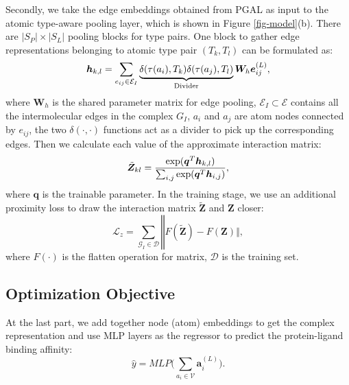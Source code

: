 \documentclass[sigconf]{acmart}
\newcommand{\gnn}{PGAL\xspace}
\newcommand{\graph}{\ensuremath{\mathcal{G}_I}}
\newcommand{\cat}{\ensuremath{\mathbin\Vert}}
\begin{document}
Secondly, we take the edge embeddings obtained from \gnn as input to the atomic type-aware pooling layer, which is shown in Figure \ref{fig-model}(b). There are $|S_P|\times|S_L|$ pooling blocks for type pairs. One block to gather edge representations belonging to atomic type pair $(T_k,T_l)$ can be formulated as:
\begin{equation}
\label{eq-pool}
   \bm{h}_{k,l} = \sum_{e_{ij} \in \mathcal{E}_I}\underbrace{ \delta(\tau(a_i), T_k) \delta(\tau(a_j),T_l)}_{{}{\rm Divider}} \bm{W}_h \bm{e}^{(L)}_{ij},
\end{equation}
where $\bm{W}_h$ is the shared parameter matrix for edge pooling, $\mathcal{E}_I \subset \mathcal{E}$ contains all the intermolecular edges in the complex $G_I$, $a_i$ and $a_j$ are atom nodes connected by $e_{ij}$, the two $\delta(\cdot,\cdot)$ functions act as a divider to pick up the corresponding edges. Then we calculate each value of the approximate interaction matrix:
\begin{equation}
\label{eq-im-normal}
   \tilde{\bm{Z}}_{kl} = \frac{{\rm exp}(\bm{q}^T \bm{h}_{k,l})}{\sum_{i,j}{\rm exp}(\bm{q}^T\bm{h}_{i,j})},
\end{equation}
where $\bm{q}$ is the trainable parameter. In the training stage, we use an additional proximity loss to draw the interaction matrix $\tilde{\bm{Z}}$ and $\bm{Z}$ closer:
\begin{equation}
    \label{eq-inter-loss}
    \bm{\mathcal{L}}_z =\sum_{\graph \in \mathcal{D}}\cat F(\tilde{\bm{Z}}) - F(\bm{Z}) \cat,
\end{equation}
where $F(\cdot)$ is the flatten operation for matrix, $\mathcal{D}$ is the training set.





\subsection{Optimization Objective}
At the last part, we add together node (atom) embeddings to get the complex representation and use MLP layers as the regressor to predict the protein-ligand binding affinity:
\begin{equation}
\label{eq-predict}
    \hat{y} = MLP\Big(\sum_{a_i \in \mathcal{V}} \bm{a}^{(L)}_i\Big).
\end{equation}
\end{document}
